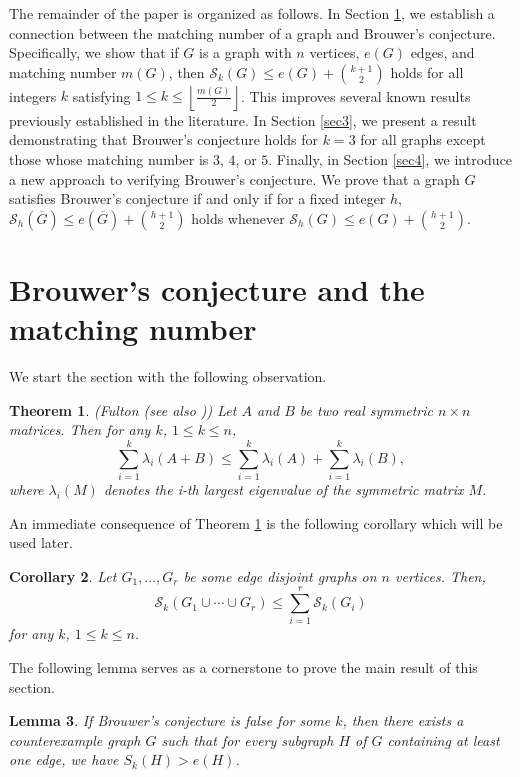 \documentclass[12pt]{article}
\theoremstyle{plain}
\newtheorem{theorem}{Theorem}[section]
\newtheorem{lemma}[theorem]{Lemma}
\newtheorem{corollary}[theorem]{Corollary}
\theoremstyle{definition}
\begin{document}
The remainder of the paper is organized as follows. In Section \ref{sec2}, we establish a connection between the matching number of a graph and Brouwer’s conjecture. Specifically, we show that if $G$ is a graph with $n$ vertices, $e(G)$ edges, and matching number $m(G)$, then $\mathcal{S}_k(G) \leq e(G) + \binom{k+1}{2}$ holds for all integers $k$ satisfying $1 \leq k \leq \left\lfloor\frac{m(G)}{2}\right\rfloor$. This improves several known results previously established in the literature. In Section \ref{sec3}, we present a result demonstrating that Brouwer’s conjecture holds for $k=3$ for all graphs except those whose matching number is $3$, $4$, or $5$.  Finally, in Section \ref{sec4}, we introduce a new approach to verifying Brouwer’s conjecture. We prove that a graph $G$ satisfies Brouwer’s conjecture if and only if for a fixed integer $h$, $\mathcal{S}_h(\overline{G})\leq e(\overline{G})+\binom{h+1}{2}$ holds whenever $\mathcal{S}_h(G)\leq e(G)+\binom{h+1}{2}$.

\section{ Brouwer's conjecture and the  matching number }\label{sec2}
We start the section with the following observation.
 
\begin{theorem}\label{weyl}
{\em (Fulton \cite{Fan1949} (see also \cite{Chen2018a}))} Let $A$ and $B$ be two real symmetric $n\times n$ matrices. Then for any $k$, $1 \leq k \leq n$,
$$\sum_{i=1}^k \lambda_i(A+B) \leq \sum_{i=1}^k \lambda_i(A)+\sum_{i=1}^k \lambda_i(B),$$ where $\lambda_i(M)$ denotes the i-th largest eigenvalue of the symmetric matrix $M$. 	
\end{theorem} 

An immediate consequence of Theorem \ref{weyl} is the following corollary which will be used later.

\begin{corollary}\label{weylcor}
Let $G_1, \ldots, G_r$ be some edge disjoint graphs on $n$ vertices. Then, $$\mathcal{S}_k\left(G_1 \cup \cdots \cup G_r\right) \leq \sum_{i=1}^r \mathcal{S}_k\left(G_i\right)$$ for any $k$, $1 \leq k \leq n$.
\end{corollary} 
The following lemma serves as a cornerstone to prove the main result of this section.
 
\begin{lemma}\label{countermat}
If Brouwer's conjecture is false for some $k$,  then there exists a counterexample graph $G$ such that for every subgraph $H$ of $G$ containing at least one edge, we have $S_k(H) > e(H)$.
\end{lemma} 
 
\end{document}
